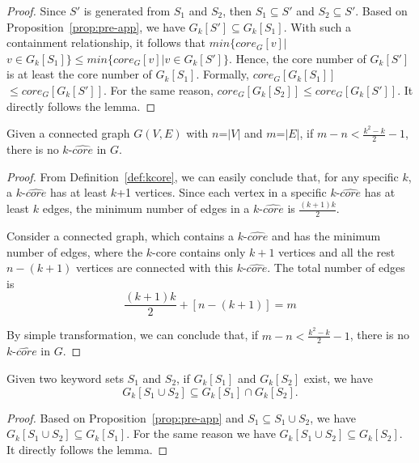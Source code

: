 \begin{proof}
Since $S'$ is generated from $S_1$ and $S_2$, then $S_1\subseteq S'$ and $S_2 \subseteq S'$. Based on Proposition~\ref{prop:pre-app}, we have $G_k[S']\subseteq G_k[S_1]$. With such a containment relationship, it follows that $min\{core_G[v]|$ $v\in G_k[S_1]\}\leq min\{core_G[v]|v\in G_k[S']\}$. Hence, the core number of $G_k[S']$ is at least the core number of $G_k[S_1]$. Formally, $core_G[G_k[S_1]]$ $\leq core_G[G_k[S']]$. For the same reason, $core_G[G_k[S_2]]\leq core_G[G_k[S']]$. It directly follows the lemma.
\end{proof}



\begin{lemma}
\label{lemma:coreExist-app}
  Given a connected graph $G(V,E)$ with $n$=$|V|$ and $m$=$|E|$,
  if $m - n < \frac{{{k^2} - k}}{2} - 1$, there is no $k$-$\widehat {core}$ in $G$.
\end{lemma}

\begin{proof}
From Definition~\ref{def:kcore}, we can easily conclude that,
for any specific $k$, a $k$-$\widehat {core}$ has at least $k$+1 vertices.
Since each vertex in a specific $k$-$\widehat {core}$ has at least $k$ edges,
the minimum number of edges in a $k$-$\widehat {core}$ is $\frac{{(k + 1)k}}{2}$.

Consider a connected graph, which contains a $k$-$\widehat {core}$ and has the minimum number of edges,
where the $k$-core contains only $k+1$ vertices and
all the rest $n-(k+1)$ vertices are connected with this $k$-$\widehat {core}$.
The total number of edges is
\begin{equation}
\frac{{(k + 1)k}}{2} + \left[ {n - (k + 1)} \right] = m
\end{equation}

By simple transformation, we can conclude that,
if $m - n < \frac{{{k^2} - k}}{2} - 1$, there is no $k$-$\widehat {core}$ in $G$.
\end{proof}



\begin{lemma}
\label{lemma:kcoreIntersect-app}
  Given two keyword sets $S_1$ and $S_2$, if $G_k[S_1]$ and $G_k[S_2]$ exist, we have
  \begin{equation}
    G_k[S_1\cup S_2] \subseteq G_k[S_1]\cap G_k[S_2].
  \end{equation}
\end{lemma}

\begin{proof}
Based on Proposition~\ref{prop:pre-app} and $S_1\subseteq {S_1} \cup {S_2}$, we have ${G_k}[{S_1} \cup {S_2}]\subseteq {G_k}[{S_1}]$. For the same reason we have ${G_k}[{S_1} \cup {S_2}]\subseteq {G_k}[{S_2}]$. It directly follows the lemma.
\end{proof}
